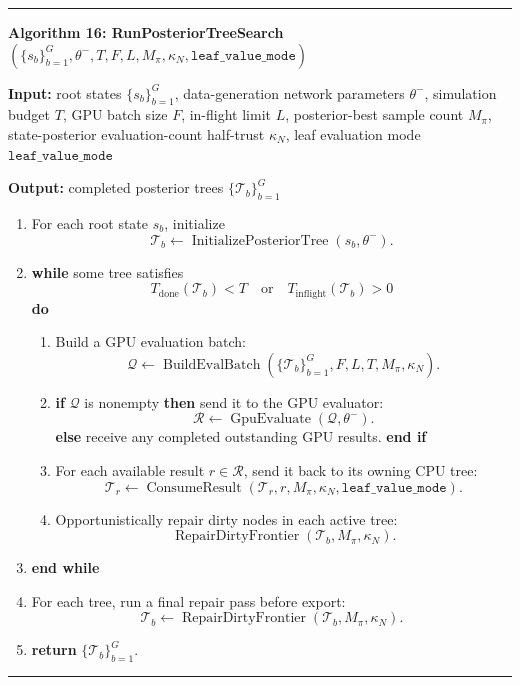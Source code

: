 \documentclass[11pt]{article}
\newcommand{\Tree}{\mathcal{T}}
\newcommand{\ConsumeResult}{\operatorname{ConsumeResult}}
\newcommand{\BuildEvalBatch}{\operatorname{BuildEvalBatch}}
\newcommand{\GpuEvaluate}{\operatorname{GpuEvaluate}}
\newcommand{\RepairDirtyFrontier}{\operatorname{RepairDirtyFrontier}}
\newenvironment{algorithmblock}[1]
{
  \par\medskip
  \noindent\hrule\par\smallskip
  \noindent\textbf{#1}
  \par\smallskip
}
{
  \par\smallskip\noindent\hrule\par\medskip
}
\newcommand{\Input}{\textbf{Input: }}
\newcommand{\Output}{\textbf{Output: }}
\newcommand{\Return}{\textbf{return }}
\newcommand{\If}{\textbf{if }}
\newcommand{\Then}{\textbf{ then }}
\newcommand{\Else}{\textbf{else }}
\newcommand{\EndIf}{\textbf{end if}}
\newcommand{\While}{\textbf{while }}
\newcommand{\EndWhile}{\textbf{end while}}
\newcommand{\Do}{\textbf{ do }}
\begin{document}
\begin{algorithmblock}{Algorithm 16: RunPosteriorTreeSearch\((\{s_b\}_{b=1}^{G},\theta^-,T,F,L,M_\pi,\kappa_N,\texttt{leaf\_value\_mode})\)}

\Input root states \(\{s_b\}_{b=1}^{G}\), data-generation network parameters \(\theta^-\), simulation budget \(T\), GPU batch size \(F\), in-flight limit \(L\), posterior-best sample count \(M_\pi\), state-posterior evaluation-count half-trust \(\kappa_N\), leaf evaluation mode \(\texttt{leaf\_value\_mode}\)

\Output completed posterior trees \(\{\Tree_b\}_{b=1}^{G}\)

\begin{enumerate}[leftmargin=2em]
  \item For each root state \(s_b\), initialize
  \[
  \Tree_b
  \gets
  \operatorname{InitializePosteriorTree}(s_b,\theta^-).
  \]

  \item \While some tree satisfies
  \[
  T_{\mathrm{done}}(\Tree_b)<T
  \quad\text{or}\quad
  T_{\mathrm{inflight}}(\Tree_b)>0
  \]
  \Do

  \begin{enumerate}[leftmargin=2em]
    \item Build a GPU evaluation batch:
    \[
    \mathcal{Q}
    \gets
    \BuildEvalBatch
    \left(
    \{\Tree_b\}_{b=1}^{G},
    F,
    L,
    T,
    M_\pi,
    \kappa_N
    \right).
    \]

    \item \If \(\mathcal{Q}\) is nonempty \Then send it to the GPU evaluator:
    \[
    \mathcal{R}
    \gets
    \GpuEvaluate(\mathcal{Q},\theta^-).
    \]
    \Else receive any completed outstanding GPU results. \EndIf

    \item For each available result \(r\in\mathcal{R}\), send it back to its
    owning CPU tree:
    \[
    \Tree_r
    \gets
    \ConsumeResult(\Tree_r,r,M_\pi,\kappa_N,\texttt{leaf\_value\_mode}).
    \]

    \item Opportunistically repair dirty nodes in each active tree:
    \[
    \RepairDirtyFrontier(\Tree_b,M_\pi,\kappa_N).
    \]
  \end{enumerate}

  \item \EndWhile

  \item For each tree, run a final repair pass before export:
  \[
  \Tree_b\gets\RepairDirtyFrontier(\Tree_b,M_\pi,\kappa_N).
  \]

  \item \Return \(\{\Tree_b\}_{b=1}^{G}\).
\end{enumerate}

\end{algorithmblock}
\end{document}
